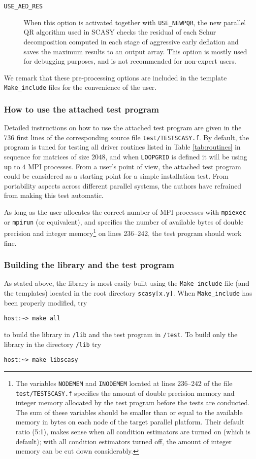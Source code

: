 \documentclass[11pt]{article}
\begin{document}
\begin{description}
\item[\texttt{USE\_AED\_RES}] When this option is activated
together with \texttt{USE\_NEWPQR}, the new parallel QR algorithm
used in SCASY checks the residual of each Schur decomposition
computed in each stage of aggressive early deflation and saves the
maximum results to an output array. This option is mostly used for
debugging purposes, and is not recommended for non-expert users.
\end{description}
%
We remark that these pre-processing options are included in the
template \texttt{Make\_include} files for the convenience of the
user.

\subsubsection{How to use the attached test program}
\label{sec:testprogram} Detailed instructions on how to use the
attached test program are given in the 736 first lines of the
corresponding source file \texttt{test/TESTSCASY.f}. By default,
the program is tuned for testing all driver routines listed in
Table \ref{tab:routines} in sequence for matrices of size $2048$,
and when \texttt{LOOPGRID} is defined it will be using up to $4$
MPI processes. From a user's point of view, the attached test
program could be considered as a starting point for a simple
installation test. From portability aspects across different
parallel systems, the authors have refrained from making this
test automatic.

As long as the user allocates the correct number of
MPI processes with {\tt mpiexec} or {\tt mpirun} (or equivalent),
and specifies the number of available bytes of double precision
and integer memory\footnote{The variables {\tt NODEMEM} and
{\tt INODEMEM} located at lines 236--242 of the file
{\tt test/TESTSCASY.f} specifies the amount of double precision memory
and integer memory allocated by the test program before
the tests are conducted. The sum of these variables should be
smaller than or equal to the available memory in bytes on each
node of the target parallel platform. Their default ratio (5:1),
makes sense when all condition estimators are turned on (which is default);
with all condition estimators turned off, the amount of integer memory
can be cut down considerably.}
on lines 236--242, the test program should work
fine.

\subsubsection{Building the library and the test program}
As stated above, the library is most easily built using the
\texttt{Make\_include} file (and the templates) located in the
root directory \texttt{scasy[x.y]}. When \texttt{Make\_include}
has been properly modified, try
%
\begin{verbatim}
host:~> make all
\end{verbatim}
%
to build the library in \texttt{/lib} and the test program in
\texttt{/test}. To build only the library in the directory
\texttt{/lib} try
%
\begin{verbatim}
host:~> make libscasy
\end{verbatim}
%
\end{document}
